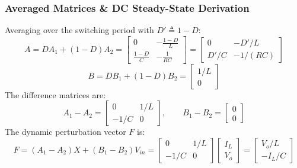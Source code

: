 \subsubsection{Averaged Matrices \& DC Steady-State Derivation}
Averaging over the switching period with $D' \triangleq 1 - D$:
\begin{equation}
A = D A_1 + (1-D) A_2 = \begin{bmatrix} 0 & -\frac{1-D}{L} \\ \frac{1-D}{C} & -\frac{1}{RC} \end{bmatrix} = \begin{bmatrix} 0 & -D'/L \\ D'/C & -1/(RC) \end{bmatrix}
\end{equation}
\begin{equation}
B = D B_1 + (1-D) B_2 = \begin{bmatrix} 1/L \\ 0 \end{bmatrix}
\end{equation}
The difference matrices are:
\begin{equation}
A_1 - A_2 = \begin{bmatrix} 0 & 1/L \\ -1/C & 0 \end{bmatrix}, \qquad B_1 - B_2 = \begin{bmatrix} 0 \\ 0 \end{bmatrix}
\end{equation}
The dynamic perturbation vector $F$ is:
\begin{equation}
\boxed{F = (A_1 - A_2) X + (B_1 - B_2) V_{in} = \begin{bmatrix} 0 & 1/L \\ -1/C & 0 \end{bmatrix} \begin{bmatrix} I_L \\ V_o \end{bmatrix} = \begin{bmatrix} V_o/L \\ -I_L/C \end{bmatrix}}
\end{equation}

